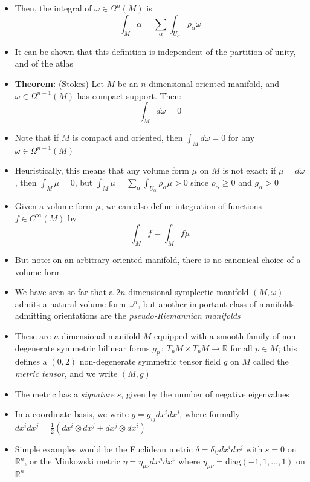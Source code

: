 \documentclass[12pt,a4paper]{article}
\numberwithin{equation}{section}
\begin{document}
\begin{itemize}
		\item Then, the integral of $\omega\in\Omega^{n}(M)$ is
		\begin{equation}
			\int_{M}\alpha=\sum_{\alpha}\int_{U_{\alpha}}\rho_{\alpha}\omega
		\end{equation}
		\item It can be shown that this definition is independent of the partition of unity, and of the atlas
		\item \textbf{Theorem:} (Stokes) Let $M$ be an $n$-dimensional oriented manifold, and $\omega\in\Omega^{n-1}(M)$ has compact support. Then:
		\begin{equation}
			\int_{M}d\omega=0
		\end{equation}
		\item Note that if $M$ is compact and oriented, then $\int_{M}d\omega=0$ for any $\omega\in\Omega^{n-1}(M)$
		\item Heuristically, this means that any volume form $\mu$ on $M$ is not exact: if $\mu=d\omega$, then $\int_{M}\mu=0$, but $\int_{M}\mu=\sum_{\alpha}\int_{U_{\alpha}}\rho_{\alpha}\mu>0$ since $\rho_{\alpha}\geq 0$ and $g_{\alpha}>0$
		\item Given a volume form $\mu$, we can also define integration of functions $f\in C^{\infty}(M)$ by
		\begin{equation}
			\int_{M}f=\int_{M}f\mu
		\end{equation}
		\item But note: on an arbitrary oriented manifold, there is no canonical choice of a volume form
		\item We have seen so far that a $2n$-dimensional symplectic manifold $(M,\omega)$ admits a natural volume form $\omega^{n}$, but another important class of manifolds admitting orientations are the \textit{pseudo-Riemannian manifolds}
		\item These are $n$-dimensional manifold $M$ equipped with a smooth family of non-degenerate symmetric bilinear forms $g_{p}\,:\,T_{p}M\times T_{p}M\to \mathbb{R}$ for all $p\in M$; this defines a $(0,2)$ non-degenerate symmetric tensor field $g$ on $M$ called the \textit{metric tensor}, and we write $(M,g)$
		\item The metric has a \textit{signature} $s$, given by the number of negative eigenvalues
		\item In a coordinate basis, we write $g=g_{ij}dx^{i}dx^{j}$, where formally $dx^{i}dx^{j}=\frac{1}{2}(dx^{i}\otimes dx^{j}+dx^{j}\otimes dx^{i})$
		\item Simple examples would be the Euclidean metric $\delta=\delta_{ij}dx^{i}dx^{j}$ with $s=0$ on $\mathbb{R}^{n}$, or the Minkowski metric $\eta=\eta_{\mu\nu}dx^{\mu}dx^{\nu}$ where $\eta_{\mu\nu}=\text{diag}(-1,1,\ldots,1)$ on $\mathbb{R}^{n}$

\end{itemize}
\end{document}

